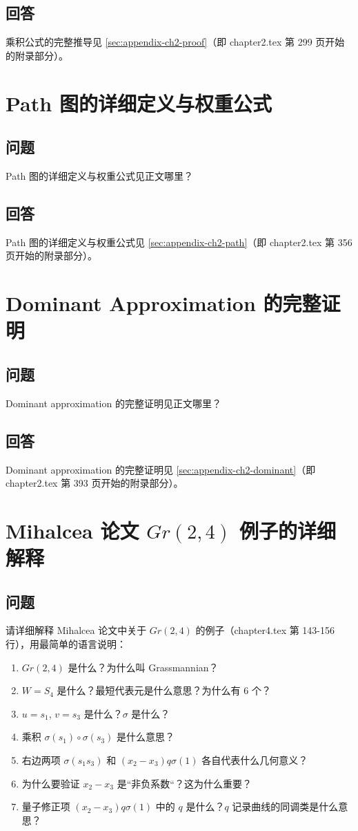 \subsection{回答}
乘积公式的完整推导见 \cref{sec:appendix-ch2-proof}（即 chapter2.tex 第 299 页开始的附录部分）。
\section{Path 图的详细定义与权重公式}
\subsection{问题}
Path 图的详细定义与权重公式见正文哪里？
\subsection{回答}
Path 图的详细定义与权重公式见 \cref{sec:appendix-ch2-path}（即 chapter2.tex 第 356 页开始的附录部分）。
\section{Dominant Approximation 的完整证明}
\subsection{问题}
Dominant approximation 的完整证明见正文哪里？
\subsection{回答}
Dominant approximation 的完整证明见 \cref{sec:appendix-ch2-dominant}（即 chapter2.tex 第 393 页开始的附录部分）。
\section{Mihalcea 论文 $Gr(2,4)$ 例子的详细解释}\label{sec:qa-gr24}
\subsection{问题}
请详细解释 Mihalcea 论文中关于 $Gr(2,4)$ 的例子（chapter4.tex 第 143-156 行），用最简单的语言说明：
\begin{enumerate}
\item $Gr(2,4)$ 是什么？为什么叫 Grassmannian？
\item $W = S_4$ 是什么？最短代表元是什么意思？为什么有 6 个？
\item $u = s_1$, $v = s_3$ 是什么？$\sigma$ 是什么？
\item 乘积 $\sigma(s_1) \circ \sigma(s_3)$ 是什么意思？
\item 右边两项 $\sigma(s_1 s_3)$ 和 $(x_2 - x_3) q \sigma(1)$ 各自代表什么几何意义？
\item 为什么要验证 $x_2 - x_3$ 是``非负系数``？这为什么重要？
\item 量子修正项 $(x_2 - x_3) q \sigma(1)$ 中的 $q$ 是什么？$q$ 记录曲线的同调类是什么意思？
\end{enumerate}
